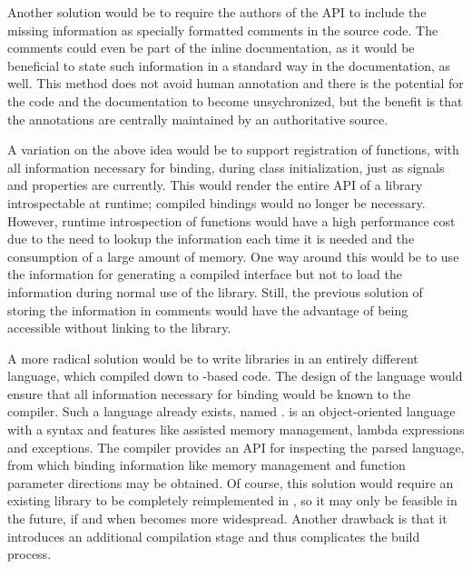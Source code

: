 \documentclass[article]{jss}
\begin{document}
Another solution would be to require the authors of the API to include
the missing information as specially formatted comments in the source
code. The comments could even be part of the inline documentation, as
it would be beneficial to state such information in a standard way in
the documentation, as well. This method does not avoid human
annotation and there is the potential for the code and the
documentation to become unsychronized, but the benefit is that the
annotations are centrally maintained by an authoritative source.

A variation on the above idea would be to support registration of
functions, with all information necessary for binding, during class 
initialization, just as signals and properties are currently. This
would render
the entire API of a library introspectable at runtime; compiled
bindings would
no longer be necessary. However, runtime introspection of functions
would
have a high performance cost due to the need to lookup the information
each time it is needed and the consumption of a large amount of memory.  
One way around this would be to use the information for generating a
compiled interface but not to load the information during normal use
of the library. Still, the previous solution of storing the
information in comments would have the advantage of being accessible
without linking to the library.

A more radical solution would be to write libraries in an entirely different language,
 which
compiled down to -based  code. The design of
the
language would ensure that all information necessary for binding would
be known to the compiler. Such a language already exists, named
 \citep{vala}. 
 is an object-oriented language with
a  syntax and features like assisted memory management,
lambda expressions and 
exceptions. The  compiler provides an API for
inspecting
the parsed language, from which binding information like memory
management
and function parameter directions may be obtained. Of course, this
solution would require an existing library to be completely
reimplemented in
, so it may only be feasible in the future, if and when
 becomes more widespread. Another drawback is that it introduces an additional compilation stage and thus complicates the build process.
\end{document}
